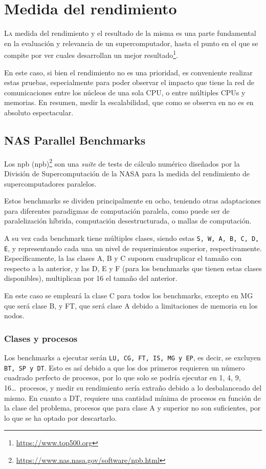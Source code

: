 \chapter{Medida del rendimiento}
\label{chap:medida_rendimiento}

\lettrine{L}{a} medida del rendimiento y el resultado de la misma es una parte fundamental en la evaluación y relevancia de un supercomputador, hasta el punto en el que se compite por ver cuales desarrollan un mejor resultado\footnote{\url{https://www.top500.org}}.

En este caso, si bien el rendimiento no es una prioridad, es conveniente realizar estas pruebas, especialmente para poder observar el impacto que tiene la red de comunicaciones entre los núcleos de una sola CPU, o entre múltiples CPUs y memorias. En resumen, medir la escalabilidad, que como se observa en  no es en absoluto espectacular.

\section{NAS Parallel Benchmarks}
Los \acrlong{npb} (\acrshort{npb})\footnote{\url{https://www.nas.nasa.gov/software/npb.html}} son una \textit{suite} de tests de cálculo numérico diseñados por la División de Supercomputación de la NASA para la medida del rendimiento de supercomputadores paralelos.

Estos benchmarks se dividen principalmente en ocho, teniendo otras adaptaciones para diferentes paradigmas de computación paralela, como puede ser de paralelización híbrida, computación desestructurada, o mallas de computación.

A su vez cada benchmark tiene múltiples clases, siendo estas \texttt{S, W, A, B, C, D, E}, y representando cada una un nivel de requerimientos superior, respectivamente. Específicamente, la las clases A, B y C suponen cuadruplicar el tamaño con respecto a la anterior, y las D, E y F (para los benchmarks que tienen estas clases disponibles), multiplican por 16 el tamaño del anterior.

En este caso se empleará la clase C para todos los benchmarks, excepto en MG que será clase B, y FT, que será clase A debido a limitaciones de memoria en los nodos.

\subsection{Clases y procesos}
\label{ssec:clases_y_procesos}
Los benchmarks a ejecutar serán \texttt{LU, CG, FT, IS, MG y EP}, es decir, se excluyen \texttt{BT, SP y DT}. Esto es así debido a que los dos primeros requieren un número cuadrado perfecto de procesos, por lo que solo se podría ejecutar en 1, 4, 9, 16\dots\ procesos, y medir su rendimiento sería extraño debido a lo desbalanceado del mismo. En cuanto a DT, requiere una cantidad mínima de procesos en función de la clase del problema, procesos que para clase A y superior no son suficientes, por lo que se ha optado por descartarlo.

